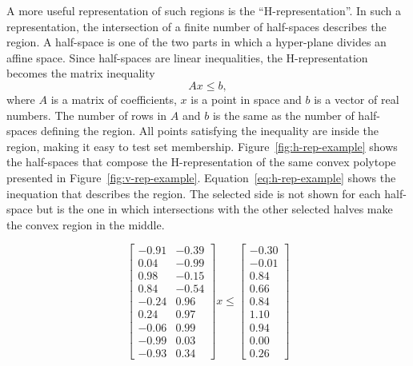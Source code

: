 A more useful representation of such regions is the \enquote{H-representation}.
In such a representation, the intersection of a finite number of half-spaces
describes the region. A half-space is one of the two parts in which a
hyper-plane divides an affine space. Since half-spaces are linear inequalities,
the H-representation becomes the matrix inequality
%
\begin{equation}
  Ax\leq{}b,
\end{equation}
%
where \(A\) is a matrix of coefficients, \(x\) is a point in space and \(b\) is
a vector of real numbers. The number of rows in \(A\) and \(b\) is the same as
the number of half-spaces defining the region. All points satisfying the
inequality are inside the region, making it easy to test set membership.
Figure~\ref{fig:h-rep-example} shows the half-spaces that compose the
H-representation of the same convex polytope presented in
Figure~\ref{fig:v-rep-example}. Equation~\ref{eq:h-rep-example} shows the
inequation that describes the region. The selected side is not shown for each
half-space but is the one in which intersections with the other selected halves
make the convex region in the middle.

\begin{equation}
  \label{eq:h-rep-example}
  \begin{bmatrix}
    -0.91 & -0.39 \\
    0.04  & -0.99 \\
    0.98  & -0.15 \\
    0.84  & -0.54 \\
    -0.24 & 0.96  \\
    0.24  & 0.97  \\
    -0.06 & 0.99  \\
    -0.99 & 0.03  \\
    -0.93 & 0.34
  \end{bmatrix}x \leq
  \begin{bmatrix}
    -0.30 \\
    -0.01 \\
    0.84  \\
    0.66  \\
    0.84  \\
    1.10  \\
    0.94  \\
    0.00  \\
    0.26
  \end{bmatrix}
\end{equation}

